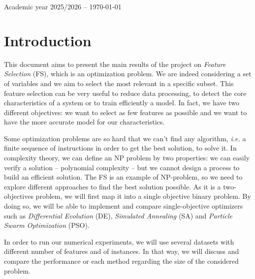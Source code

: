 \documentclass[12pt, openany]{article}
\begin{document}
\begin{titlepage}
\begin{sffamily}
\begin{center}
    \vfill


    {Academic year 2025/2026 -- \today}

  \end{center}
  \end{sffamily}
\end{titlepage}

\clearpage %


\tableofcontents

\newpage

\section*{Introduction}

This document aims to present the main results of the project on \emph{Feature Selection} (FS), which is an optimization problem. We are indeed considering a set of variables and we aim to select the most relevant in a specific subset. This feature selection can be very useful to reduce data processing, to detect the core characteristics of a system or to train efficiently a model. In fact, we have two different objectives: we want to select as few features as possible and we want to have the more accurate model for our characteristics.

Some optimization problems are so hard that we can't find any algorithm, \textit{i.e.} a finite sequence of instructions in order to get the best solution, to solve it. In complexity theory, we can define an NP problem by two properties: we can easily verify a solution -- polynomial complexity -- but we cannot design a process to build an efficient solution. The FS is an example of NP-problem, so we need to explore different approaches to find the best solution possible. As it is a two-objectives problem, we will first map it into a single objective binary problem. By doing so, we will be able to implement and compare single-objective optimizers such as \emph{Differential Evolution} (DE), \emph{Simulated Annealing} (SA) and \emph{Particle Swarm Optimization} (PSO). %

In order to run our numerical experiments, we will use several datasets with different number of features and of instances. In that way, we will discuss and compare the performance or each method regarding the size of the considered problem.
\end{document}
